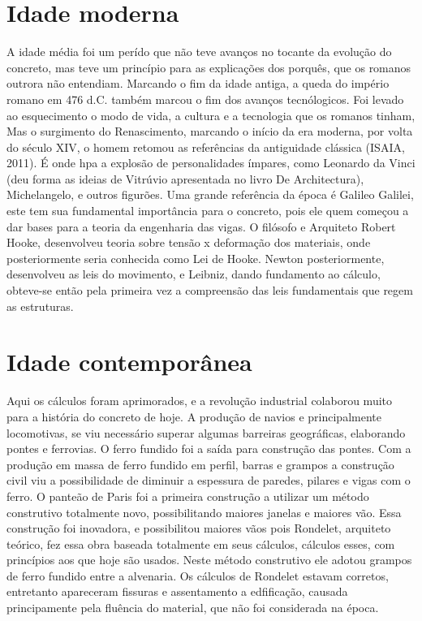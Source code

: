 \section{Idade moderna}

A idade média foi um perído que não teve avanços no tocante da evolução do concreto, mas teve um princípio para as explicações dos porquês, que os romanos outrora não entendiam.
Marcando o fim da idade antiga, a queda do império romano em 476 d.C. também marcou o fim dos avanços tecnólogicos. Foi levado ao esquecimento o modo de vida, a cultura e a tecnologia que os romanos tinham, Mas o surgimento do Renascimento, marcando o início da era moderna, por volta do século XIV, o homem retomou as referências da antiguidade clássica (ISAIA, 2011).
É onde hpa a explosão de personalidades ímpares, como Leonardo da Vinci (deu forma as ideias de Vitrúvio apresentada no livro De Architectura), Michelangelo, e outros figurões. Uma grande referência da época é Galileo Galilei, este tem sua fundamental importância para o concreto, pois ele quem começou a dar bases para a teoria da engenharia das vigas.
O filósofo e Arquiteto Robert Hooke, desenvolveu teoria sobre tensão x deformação dos materiais, onde posteriormente seria conhecida como Lei de Hooke.
Newton posteriormente, desenvolveu as leis do movimento, e Leibniz, dando fundamento ao cálculo, obteve-se então pela primeira vez a compreensão das leis fundamentais que regem as estruturas.

\section{Idade contemporânea}

Aqui os cálculos foram aprimorados, e a revolução industrial colaborou muito para a história do concreto de hoje. A produção de navios e principalmente locomotivas, se viu necessário superar algumas barreiras geográficas, elaborando pontes e ferrovias.
O ferro fundido foi a saída para construção das pontes. Com a produção em massa de ferro fundido em perfil, barras e grampos a construção civil viu a possibilidade de diminuir a espessura de paredes, pilares e vigas com o ferro. O panteão de Paris foi a primeira construção a utilizar um método construtivo totalmente novo, possibilitando maiores janelas e maiores vão. Essa construção foi inovadora, e possibilitou maiores vãos pois Rondelet, arquiteto teórico, fez essa obra baseada totalmente em seus cálculos, cálculos esses, com princípios aos que hoje são usados. Neste método construtivo ele adotou grampos de ferro fundido entre a alvenaria. Os cálculos de Rondelet estavam corretos, entretanto apareceram fissuras e assentamento a edfificação, causada principamente pela fluência do material, que não foi considerada na época.

